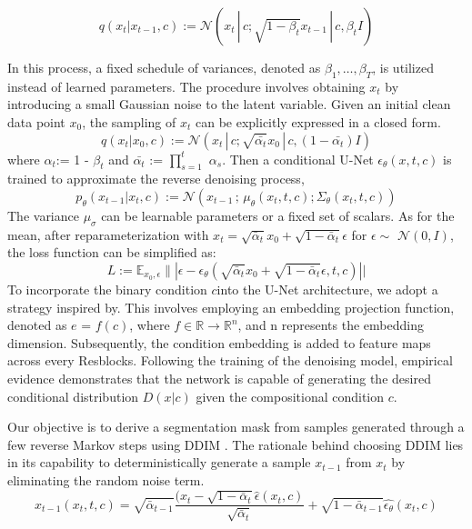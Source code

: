 \begin{equation}
q(x_t | x_{t-1}, c) := \mathcal{N} (x_t \,|\, c; \sqrt{1 - \beta_t} x_{t-1} \,|\, c, \beta_t I)
\end{equation}



In this process, a fixed schedule of variances, denoted as \( \beta_1, \ldots, \beta_T \), is utilized instead of learned parameters. The procedure involves obtaining \( x_t \) by introducing a small Gaussian noise to the latent variable. Given an initial clean data point \( x_0 \), the sampling of \( x_t \) can be explicitly expressed in a closed form.
\begin{equation}
q(x_t | x_{0}, c) := \mathcal{N} (x_t \,|\, c; \sqrt{\bar{\alpha_t}} x_{0} \,|\, c, (1 - \bar{\alpha_t}) I)
\end{equation}
where $\alpha_t$:= 1 - $\beta_t$ and $\bar{\alpha_t}$ := $\prod_{s=1}^{t}$ $\alpha_s$.
Then a conditional U-Net $\epsilon_{\theta}(x, t, c)$ is trained to approximate the reverse denoising process,
\begin{equation}
p_{\theta}(x_{t-1} | x_t, c) := \mathcal{N} (x_{t-1} \,;\, \mu_{\theta}(x_{t}, t, c); \Sigma_{\theta}(x_{t}, t, c))
\end{equation}
The variance \(\mu_{\sigma}\) can be learnable parameters or a fixed set of scalars. As for the mean, after reparameterization with \(x_{t} = \sqrt{\bar\alpha_{t}}x_{0} + \sqrt{1 - \bar\alpha_{t}}\epsilon\)  for $\epsilon\sim$ $\mathcal{N} (0, I)$, the loss function can be simplified as:
\begin{equation}
L := \mathbb{E}_{x_0,\epsilon}\||\epsilon - \epsilon_{\theta}(\sqrt{\bar{\alpha}_t}x_0 + \sqrt{1 - \bar{\alpha}_t}\epsilon, t, c)||
\end{equation}
To incorporate the binary condition \(c\)into the U-Net architecture, we adopt a strategy inspired by\cite{classifierfree}. This involves employing an embedding projection function, denoted as $e$ = $f(c)$, where $f \in \mathbb{R} → \mathbb{R}^n$, and n represents the embedding dimension. Subsequently, the condition embedding is added to feature maps across every Resblocks\cite{BeatGAN}. Following the training of the denoising model, empirical evidence demonstrates that the network is capable of generating the desired conditional distribution $D(x|c)$ given the compositional condition $c$.

Our objective is to derive a segmentation mask from samples generated through a few reverse Markov steps using DDIM \cite{DDIM}. The rationale behind choosing DDIM lies in its capability to deterministically generate a sample \(x_{t-1}\) from \(x_t\) by eliminating the random noise term.
\begin{equation}
x_{t-1}(x_{t}, t, c) = \sqrt{\bar\alpha_{t-1}}\frac{(x_{t} - \sqrt{1-\bar\alpha_{t}}\hat{\epsilon}(x_{t},c)}{\sqrt{\bar\alpha_{t}}}+\sqrt{1-\bar\alpha_{t-1}}\hat{\epsilon_{\theta}}(x_{t},c)
\end{equation}


